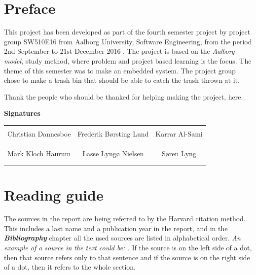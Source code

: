 \chapter*{Preface}
This project has been developed as part of the fourth semester project by project group SW510E16 from Aalborg University, Software Engineering, from the period 2nd September to 21st December 2016 . \newline
The project is based on the \textit{Aalborg-model}, study method, where problem and project based learning is the focus. The theme of this semester was to make an embedded system. The project group chose to make a trash bin that should be able to catch the trash thrown at it. \newline

Thank the people who should be thanked for helping making the project, here. 
\newline
\newline
\newline
\newline

{\Huge\textbf{Signatures}}
\newline
\newline

\begin{table}[H]
	\centering
		\begin{tabular}{c c c}
			\underline{\phantom{mmmmmmmmmmmmmm}} & \underline{\phantom{mmmmmmmmmmmmmm}} & \underline{\phantom{mmmmmmmmmmmmmm}} \\
			Christian Dannesboe			& Frederik Børsting Lund 		& Karrar Al-Sami 			\\
			&&\\
			&&\\
			\underline{\phantom{mmmmmmmmmmmmmm}} & \underline{\phantom{mmmmmmmmmmmmmm}} & \underline{\phantom{mmmmmmmmmmmmmm}} \\
			Mark Kloch Haurum			& Lasse Lyngø Nielsen 		& Søren Lyng 				\\
			&&\\
			&&\\
		 																		
		\end{tabular}
\end{table}

\chapter*{Reading guide}
The sources in the report are being referred to by the Harvard citation method. This includes a last name and a publication year in the report, and in the \textit{\textbf{Bibliography}} chapter all the used sources are listed in alphabetical order. \newline
\textit{An example of a source in the text could be: \textbf{\citep{Servo}}.}
\newline
If the source is on the left side of a dot, then that source refers only to that sentence and if the source is on the right side of a dot, then it refers to the whole section. 

